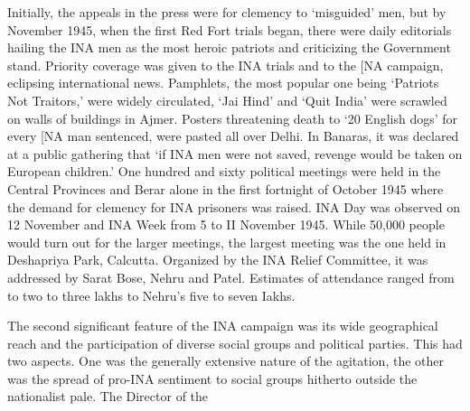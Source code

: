 Initially, the appeals in the press were for clemency to ‘misguided’ men, but by November 1945, when the first Red Fort trials began, there were daily editorials hailing the INA men as the most heroic patriots and criticizing the Government stand. Priority coverage was given to the INA trials and to the [NA campaign, eclipsing international news. Pamphlets, the most popular one being ‘Patriots Not Traitors,’ were widely circulated, ‘Jai Hind’ and ‘Quit India’ were scrawled on walls of buildings in Ajmer. Posters threatening death to ‘20 English dogs’ for every [NA man sentenced, were pasted all over Delhi. In Banaras, it was declared at a public gathering that ‘if INA men were not saved, revenge would be taken on European children.’ One hundred and sixty political meetings were held in the Central Provinces and Berar alone in the first fortnight of October 1945 where the demand for clemency for INA prisoners was raised. INA Day was observed on 12 November and INA Week from 5 to II November 1945. While 50,000 people would turn out for the larger meetings, the largest meeting was the one held in Deshapriya Park, Calcutta. Organized by the INA Relief Committee, it was addressed by Sarat Bose, Nehru and Patel. Estimates of attendance ranged from to two to three lakhs to Nehru’s five to seven Iakhs. 

The second significant feature of the INA campaign was its wide geographical reach and the participation of diverse social groups and political parties. This had two aspects. One was the generally extensive nature of the agitation, the other was the spread of pro-INA sentiment to social groups hitherto outside the nationalist pale. The Director of the 

